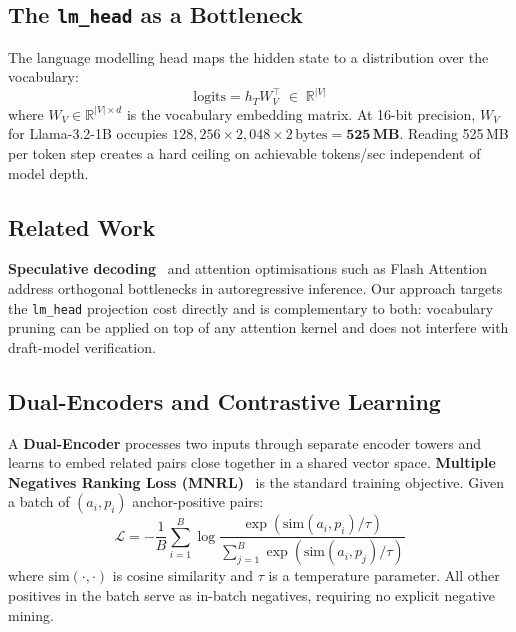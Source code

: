 \documentclass[twocolumn,10pt]{article}
\newcommand{\code}[1]{\texttt{#1}}
\begin{document}
\subsection{The \texttt{lm\_head} as a Bottleneck}

The language modelling head maps the hidden state to a distribution over the
vocabulary:
\begin{equation}
  \text{logits} = h_T W_V^\top \;\in\; \mathbb{R}^{|V|}
\end{equation}
where $W_V \in \mathbb{R}^{|V| \times d}$ is the vocabulary embedding matrix.
At 16-bit precision, $W_V$ for Llama-3.2-1B occupies
$128{,}256 \times 2{,}048 \times 2\,\text{bytes} = \mathbf{525\,\text{MB}}$.
Reading 525\,MB per token step creates a hard ceiling on achievable
tokens/sec independent of model depth.

\subsection{Related Work}

\textbf{Speculative decoding}~\cite{leviathan2023,chen2023} and attention
optimisations such as Flash Attention address orthogonal bottlenecks in
autoregressive inference. Our approach targets the \code{lm\_head} projection
cost directly and is complementary to both: vocabulary pruning can be applied
on top of any attention kernel and does not interfere with draft-model
verification.

\subsection{Dual-Encoders and Contrastive Learning}

A \textbf{Dual-Encoder} processes two inputs through separate encoder towers
and learns to embed related pairs close together in a shared vector space.
\textbf{Multiple Negatives Ranking Loss (MNRL)}~\cite{henderson2017,karpukhin2020}
is the standard training objective. Given a batch of $(a_i, p_i)$
anchor-positive pairs:
\begin{equation}
  \mathcal{L} = -\frac{1}{B}\sum_{i=1}^{B}
    \log\frac{\exp(\text{sim}(a_i,p_i)/\tau)}
             {\sum_{j=1}^{B}\exp(\text{sim}(a_i,p_j)/\tau)}
\end{equation}
where $\text{sim}(\cdot,\cdot)$ is cosine similarity and $\tau$ is a
temperature parameter. All other positives in the batch serve as in-batch
negatives, requiring no explicit negative mining.

\end{document}

